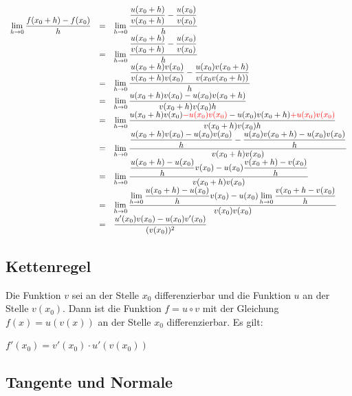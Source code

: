 \begin{Beweis}
$
\begin{array}{rcl}
\lim\limits_{h \rightarrow 0} {\dfrac{f(x_{0}+h)-f(x_{0})}{h}}&=& \lim\limits_{h \rightarrow 0} { \dfrac{ \dfrac{u(x_{0}+h)} {v(x_{0}+h)}- \dfrac{u(x_{0})}  {v(x_{0})}}  {h}}\\
&=&\lim\limits_{h \rightarrow 0} {\dfrac{\dfrac {u(x_{0}+h)}{v(x_{0}+h)}-\dfrac {u(x_{0})} {v(x_{0})}}   {h}}\\
&=&\lim\limits_{h \rightarrow 0} {\dfrac {\dfrac{  u(x_{0}+h)v(x_{0})}{v(x_{0}+h)v(x_{0})}   -\dfrac{u(x_{0})v(x_{0}+h)}{v(x_{0}v(x_{0}+h))}} {h}}\\
&=&\lim\limits_{h \rightarrow 0} {\dfrac     {u(x_{0}+h)v(x_{0})-u(x_{0})v(x_{0}+h)}    {v(x_{0}+h)v(x_{0})h }}\\
&=&\lim\limits_{h \rightarrow 0} {\dfrac {u(x_{0}+h)v(x_{0}) \textcolor{red}{-u(x_{0})v(x_{0})} -u(x_{0})v(x_{0}+h) \textcolor{red}{+u(x_{0})v(x_{0})}}  {v(x_{0}+h)v(x_{0})h}   }\\
&=&\lim\limits_{h \rightarrow 0} {\dfrac   {\dfrac{u(x_{0}+h)v(x_{0})-u(x_{0})v(x_{0})}{h}  -   \dfrac{u(x_{0})v(x_{0}+h)-u(x_{0})v(x_{0})} {h} }    {v(x_{0}+h)v(x_{0})}}\\
&=&\lim\limits_{h \rightarrow 0} { \dfrac     {\dfrac{u(x_{0}+h)-u(x_{0})}{h} v(x_{0})  -   u(x_{0}) \dfrac   {v(x_{0}+h)-v(x_{0})}  {h}  }         {v(x_{0}+h)v(x_{0})}     }\\
&=&\lim\limits_{h \rightarrow 0} { \dfrac  {\lim\limits_{h \rightarrow 0} {\dfrac{u(x_{0}+h)-u(x_{0})}{h}   }v(x_{0})  - u(x_{0}) \lim\limits_{h \rightarrow 0} { \dfrac{ v(x_{0}+h-v(x_{0})}{h}   }  }      {v(x_{0})v(x_{0})}}    \\
&=& { \dfrac{u'(x_{0})v(x_{0})-u(x_{0})v'(x_{0})} {(v(x_{0}))^2}    }\\
\end{array}
$
\end{Beweis}

\subsection{Kettenregel}

Die Funktion $v$ sei an der Stelle $x_{0}$ differenzierbar und die Funktion $u$ an der Stelle $v(x_{0})$. Dann ist die Funktion $f=u\circ v$ mit der Gleichung $f(x)= u(v(x))$ an der Stelle $x_{0}$ differenzierbar. Es gilt:

$f'(x_{0})=v'(x_{0})\cdot u'(v(x_{0}))$


\subsection{Tangente und Normale}

